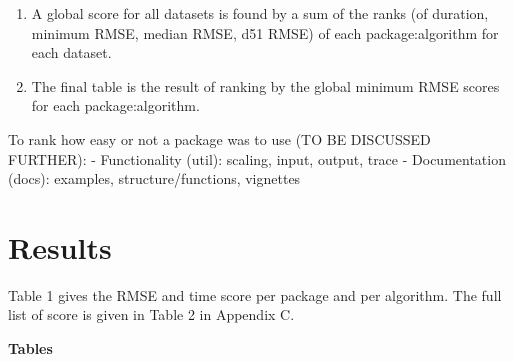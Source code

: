 \begin{enumerate}
\def\labelenumi{\arabic{enumi}.}
\setcounter{enumi}{3}
\tightlist
\item
  A global score for all datasets is found by a sum of the ranks (of
  duration, minimum RMSE, median RMSE, d51 RMSE) of each
  package:algorithm for each dataset.
\item
  The final table is the result of ranking by the global minimum RMSE
  scores for each package:algorithm.
\end{enumerate}

To rank how easy or not a package was to use (TO BE DISCUSSED FURTHER):
- Functionality (util): scaling, input, output, trace - Documentation
(docs): examples, structure/functions, vignettes

\hypertarget{results}{%
\section{Results}\label{results}}

Table 1 gives the RMSE and time score per package and per algorithm. The
full list of score is given in Table 2 in Appendix C.

\textbf{Tables}

